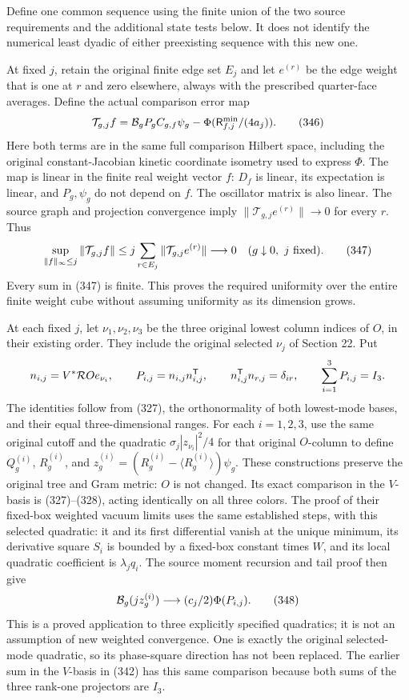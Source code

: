 \documentclass[
  11pt,
]{article}
\begin{document}
Define one common sequence using the finite union of the two source
requirements and the additional state tests below. It does not identify
the numerical least dyadic of either preexisting sequence with this new
one.

At fixed \(j\), retain the original finite edge set \(E_j\) and let
\(e^{(r)}\) be the edge weight that is one at \(r\) and zero elsewhere,
always with the prescribed quarter-face averages. Define the actual
comparison error map \[
 {\cal T}_{g,j}f
  ={\cal B}_gP_g C_{g,f}\psi_g
          -\Phi({\mathsf R}_{f,j}^{\min}/(4a_j)).
 \tag{346}
\] Here both terms are in the same full comparison Hilbert space,
including the original constant-Jacobian kinetic coordinate isometry
used to express \(\Phi\). The map is linear in the finite real weight
vector \(f\): \(D_f\) is linear, its expectation is linear, and
\(P_g,\psi_g\) do not depend on \(f\). The oscillator matrix is also
linear. The source graph and projection convergence imply
\(\|\mathcal T_{g,j}e^{(r)}\|\to0\) for every \(r\). Thus \[
 \sup_{\|f\|_\infty\le j}\|{\cal T}_{g,j}f\|
 \le j\sum_{r\in E_j}\|{\cal T}_{g,j}e^{(r)}\|
 \longrightarrow0\quad(g\downarrow0,\ j\hbox{ fixed}).
 \tag{347}
\] Every sum in (347) is finite. This proves the required uniformity
over the entire finite weight cube without assuming uniformity as its
dimension grows.

At each fixed \(j\), let \(\nu_1,\nu_2,\nu_3\) be the three original
lowest column indices of \(O\), in their existing order. They include
the original selected \(\nu_j\) of Section 22. Put \[
 n_{i,j}=V^*{\cal R}Oe_{\nu_i},\qquad
 P_{i,j}=n_{i,j}n_{i,j}^{\mathsf T},\qquad
 n_{i,j}^{\mathsf T}n_{r,j}=\delta_{ir},\qquad
 \sum_{i=1}^3P_{i,j}=I_3.
\] The identities follow from (327), the orthonormality of both
lowest-mode bases, and their equal three-dimensional ranges. For each
\(i=1,2,3\), use the same original cutoff and the quadratic
\(\sigma_j|z_{\nu_i}|^2/4\) for that original \(O\)-column to define
\(Q_g^{(i)}\), \(R_g^{(i)}\), and
\(z_g^{(i)}=(R_g^{(i)}-\langle R_g^{(i)}\rangle)\psi_g\). These
constructions preserve the original tree and Gram metric: \(O\) is not
changed. Its exact comparison in the \(V\)-basis is (327)--(328), acting
identically on all three colors. The proof of their fixed-box weighted
vacuum limits uses the same established steps, with this selected
quadratic: it and its first differential vanish at the unique minimum,
its derivative square \(S_i\) is bounded by a fixed-box constant times
\(W\), and its local quadratic coefficient is \(\lambda_jq_i\). The
source moment recursion and tail proof then give \[
 {\cal B}_g(jz_g^{(i)})
             \longrightarrow(c_j/2)\Phi(P_{i,j}).
 \tag{348}
\] This is a proved application to three explicitly specified
quadratics; it is not an assumption of new weighted convergence. One is
exactly the original selected-mode quadratic, so its phase-square
direction has not been replaced. The earlier sum in the \(V\)-basis in
(342) has this same comparison because both sums of the three rank-one
projectors are \(I_3\).
\end{document}
